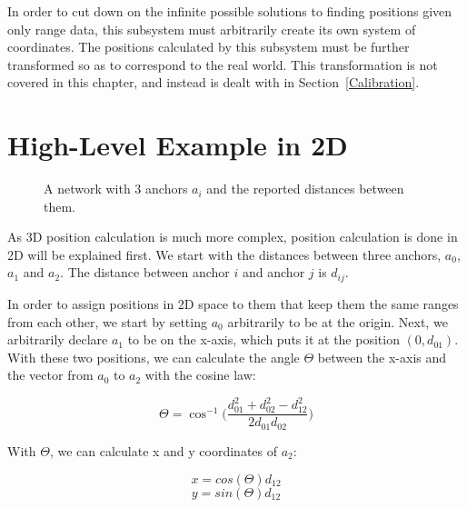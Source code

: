 In order to cut down on the infinite possible solutions to finding positions given only range data, this subsystem must arbitrarily create its own system of coordinates. The positions calculated by this subsystem must be further transformed so as to correspond to the real world. This transformation is not covered in this chapter, and instead is dealt with in Section~\ref{Calibration}.

\section{High-Level Example in 2D}

\begin{figure}
	\centering
	
	\decoRule
	\caption{A network with 3 anchors $a_i$ and the reported distances between them.}
	\label{fig:PositionCalculationNetwork}
\end{figure}

As 3D position calculation is much more complex, position calculation is done in 2D will be explained first. We start with the distances between three anchors, $a_{0}$, $ a_{1}$  and $a_{2}$. The distance between anchor $i$ and anchor $j$ is $d_{ij}$. 

In order to assign positions in 2D space to them that keep them the same ranges from each other, we start by setting $a_{0}$ arbitrarily to be at the origin. Next, we arbitrarily declare $a_{1}$ to be on the x-axis, which puts it at the position $(0, d_{01})$. With these two positions, we can calculate the angle $\Theta$ between the x-axis and the vector from $a_0$ to $a_2$ with the cosine law:

\[ \Theta = \cos ^{-1}\Big(\frac{d_{01}^2 + d_{02}^2 - d_{12}^2 }{2 d_{01} d_{02}}\Big)\]

With $\Theta$, we can calculate x and y coordinates of $a_2$:

\[ x = cos(\Theta) d_{12} \]
\[ y = sin(\Theta) d_{12} \]

